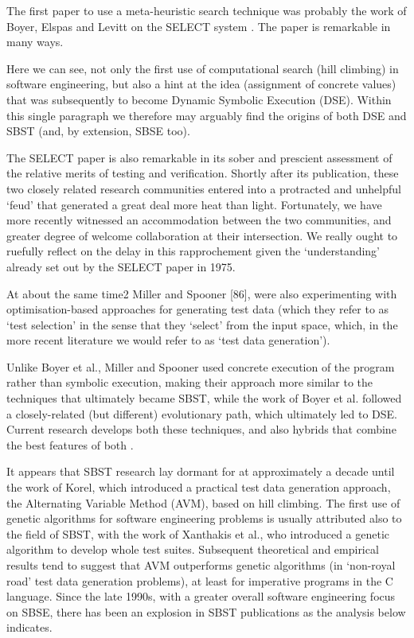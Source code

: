 \documentclass[conference]{IEEEtran}
\begin{document}
The first paper to use a meta-heuristic search technique was
probably the work of Boyer, Elspas and Levitt on the SELECT
system \cite{10.1145/800027.808445}. The paper is remarkable in many ways.

Here we can see, not only the first use of computational
search (hill climbing) in software engineering, but also a
hint at the idea (assignment of concrete values) that was
subsequently to become Dynamic Symbolic Execution (DSE). 
Within this single paragraph we therefore may arguably
find the origins of both DSE and SBST (and, by extension,
SBSE too).

The SELECT paper is also remarkable in its sober and
prescient assessment of the relative merits of testing and
verification. Shortly after its publication, these two closely
related research communities entered into a protracted and
unhelpful ‘feud’ that generated a great deal more heat than
light. Fortunately, we have more recently
witnessed an accommodation between the two communities, 
and greater degree of welcome collaboration at their
intersection. We really ought to ruefully reflect on the
delay in this rapprochement given the ‘understanding’ already
set out by the SELECT paper in 1975.

At about the same time2 Miller and Spooner [86], were
also experimenting with optimisation-based approaches for
generating test data (which they refer to as ‘test selection’
in the sense that they ‘select’ from the input space, which,
in the more recent literature we would refer to as ‘test data
generation’).

Unlike Boyer et al., Miller and Spooner used concrete
execution of the program rather than symbolic execution,
making their approach more similar to the techniques that
ultimately became SBST, while the work of Boyer et al.
followed a closely-related (but different) evolutionary path,
which ultimately led to DSE. Current research develops both
these techniques, and also hybrids that combine the best
features of both \cite{6100119, 10.1145/1321631.1321700}.

It appears that SBST research lay dormant for at approximately 
a decade until the work of Korel, which introduced
a practical test data generation approach, the Alternating
Variable Method (AVM), based on hill climbing. The first
use of genetic algorithms for software engineering problems
is usually attributed also to the field of SBST, with the
work of Xanthakis et al., who introduced a genetic
algorithm to develop whole test suites. Subsequent theoretical
and empirical results tend to suggest that AVM outperforms
genetic algorithms (in ‘non-royal road’ test data generation
problems), at least for imperative programs in the C language. 
Since the late 1990s, with a greater overall software
engineering focus on SBSE, there has been an explosion in
SBST publications as the analysis below indicates.
\end{document}
